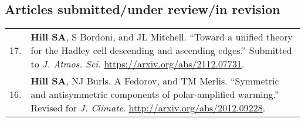 \documentclass[letterpaper,11pt]{shillcv}
\begin{document}
\subsection*{Articles submitted/under review/in revision}
\begin{longtable}{@{}  p{} @{} L{0.96\textwidth} @{}}
17. & \textbf{Hill SA}, S Bordoni, and JL Mitchell.  ``Toward a unified theory for the Hadley cell descending and ascending edges.''  Submitted to \emph{J. Atmos. Sci.}  \href{https://arxiv.org/abs/2112.07731}{https://arxiv.org/abs/2112.07731}.\\
16. & \textbf{Hill SA}, NJ Burls, A Fedorov, and TM Merlis.  ``Symmetric and antisymmetric components of polar-amplified warming.''  Revised for \emph{J. Climate}.  \href{http://arxiv.org/abs/2012.09228}{http://arxiv.org/abs/2012.09228}.\\
\end{longtable}
\end{document}

